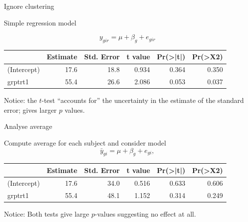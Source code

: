 \documentclass[
  ignorenonframetext,
]{beamer}
\begin{document}
\begin{frame}

\begin{block}{Ignore clustering}

Simple regression model

\[
y_{gir} = \mu + \beta_g + e_{gir}
\]

\small

\begin{table}[!h]
\centering
\begin{tabular}{lrrrrr}
\toprule
  & Estimate & Std. Error & t value & Pr(>|t|) & Pr(>X2)\\
\midrule
(Intercept) & 17.6 & 18.8 & 0.934 & 0.364 & 0.350\\
grptrt1 & 55.4 & 26.6 & 2.086 & 0.053 & 0.037\\
\bottomrule
\end{tabular}
\end{table}

\normalsize

Notice: the \(t\)-test ``accounts for'' the uncertainty in the estimate
of the standard error; gives larger \(p\) values.

\end{block}

\end{frame}

\begin{frame}

\begin{block}{Analyse average}

Compute average for each subject and consider model \[
\bar y_{gi} = \mu + \beta_g + e_{gi}, 
\]

\small

\begin{table}[!h]
\centering
\begin{tabular}{lrrrrr}
\toprule
  & Estimate & Std. Error & t value & Pr(>|t|) & Pr(>X2)\\
\midrule
(Intercept) & 17.6 & 34.0 & 0.516 & 0.633 & 0.606\\
grptrt1 & 55.4 & 48.1 & 1.152 & 0.314 & 0.249\\
\bottomrule
\end{tabular}
\end{table}

\normalsize

Notice: Both tests give large \(p\)-values suggesting no effect at all.

\end{block}

\end{frame}
\end{document}
